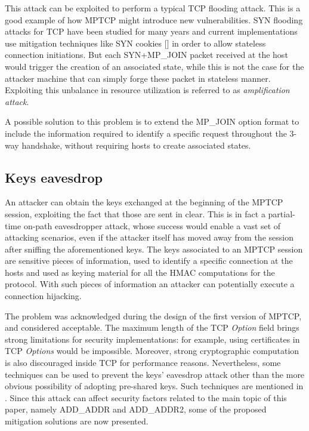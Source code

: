 This attack can be exploited to perform a typical TCP flooding attack. This is a good example of how MPTCP might introduce new vulnerabilities. 
SYN flooding attacks for TCP have been studied for many years and current implementations use mitigation techniques like SYN cookies [] in order to allow stateless connection initiations. But each SYN+MP\_JOIN packet received at the host would trigger the creation of an associated state, while this is not the case for the attacker machine that can simply forge these packet in stateless manner. Exploiting this unbalance in resource utilization is referred to as \textit{amplification attack}.

A possible solution to this problem is to extend the MP\_JOIN option format to include the information required to identify a specific request throughout the 3-way handshake, without requiring hosts to create associated states.

\subsection{Keys eavesdrop}
\label{keyseav}
An attacker can obtain the keys exchanged at the beginning of the MPTCP session, exploiting the fact that those are sent in clear. This is in fact a partial-time on-path eavesdropper attack, whose success would enable a vast set of attacking scenarios, even if the attacker itself has moved away from the session after sniffing the aforementioned keys.
The keys associated to an MPTCP session are sensitive pieces of information, used to identify a specific connection at the hosts and used as keying material for all the HMAC computations for the protocol. With such pieces of information an attacker can potentially execute a connection hijacking.  

The problem was acknowledged during the design of the first version of MPTCP, and considered acceptable. The maximum length of the TCP \textit{Option} field brings strong limitations for security implementations: for example, using certificates in TCP \textit{Options} would be impossible. Moreover, strong cryptographic computation is also discouraged inside TCP for performance reasons. Nevertheless, some techniques can be used to prevent the keys' eavesdrop attack other than the more obvious possibility of adopting pre-shared keys. Such techniques are mentioned in . Since this attack can affect security factors related to the main topic of this paper, namely ADD\_ADDR and ADD\_ADDR2, some of the proposed mitigation solutions are now presented.

